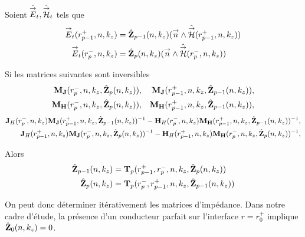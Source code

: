     \begin{prop}%
      \label{prop:cylindre:synthese:impedance}{}~

      Soient \(\hat{{\overset{\rightarrow}{E}}}_t,\hat{{\overset{\rightarrow}{\mathcal{H}}}}_t\) tels que 
      \begin{align*}
      {\overset{\rightarrow}{E}}_t(r_{p-1}^+,n,k_z) &= \hat{\mathbf{Z}}_{p-1}(n,k_z)({\overset{\rightarrow}{n}} \wedge \hat{{\overset{\rightarrow}{\mathcal{H}}}}(r_{p-1}^+,n,k_z))
      \\
      {\overset{\rightarrow}{E}}_t(r_{p}^-,n,k_z) &= \hat{\mathbf{Z}}_{p}(n,k_z)({\overset{\rightarrow}{n}} \wedge \hat{{\overset{\rightarrow}{\mathcal{H}}}}(r_{p}^-,n,k_z))
      \end{align*}

      Si les matrices suivantes sont inversibles
      \begin{align*}
        \mathbf{M}_{\mathbf{J}}(r_p^-,n,k_z,\hat{\mathbf{Z}}_{p}(n,k_z)), && \mathbf{M}_{\mathbf{J}}(r_{p-1}^+,n,k_z,\hat{\mathbf{Z}}_{p-1}(n,k_z)),
        \\
        \mathbf{M}_{\mathbf{H}}(r_p^-,n,k_z,\hat{\mathbf{Z}}_{p}(n,k_z)), && \mathbf{M}_{\mathbf{H}}(r_{p-1}^+,n,k_z,\hat{\mathbf{Z}}_{p-1}(n,k_z)),
      \end{align*}
      \begin{align*}
        \mathbf{J}_{H}(r_{p}^-,n,k_z)\mathbf{M}_{\mathbf{J}}(r_{p-1}^+,n,k_z,\hat{\mathbf{Z}}_{p-1}(n,k_z))^{-1} - \mathbf{H}_{H}(r_{p}^-,n,k_z)\mathbf{M}_{\mathbf{H}}(r_{p-1}^+,n,k_z,\hat{\mathbf{Z}}_{p-1}(n,k_z))^{-1},
        \\
        \mathbf{J}_{H}(r_{p-1}^+,n,k_z)\mathbf{M}_{\mathbf{J}}(r_{p}^-,n,k_z,\hat{\mathbf{Z}}_{p}(n,k_z))^{-1} - \mathbf{H}_{H}(r_{p-1}^+,n,k_z)\mathbf{M}_{\mathbf{H}}(r_{p}^-,n,k_z,\hat{\mathbf{Z}}_{p}(n,k_z))^{-1},
      \end{align*}

      Alors 
      \begin{align*}
        \hat{\mathbf{Z}}_{p-1}(n,k_z) &= \mathbf{T}_p(r_{p-1}^+,r_{p}^-,n,k_z,\hat{\mathbf{Z}}_{p}(n,k_z))
        \\
        \hat{\mathbf{Z}}_{p}(n,k_z) &= \mathbf{T}_p(r_{p}^-,r_{p-1}^+,n,k_z,\hat{\mathbf{Z}}_{p-1}(n,k_z))
      \end{align*}

    \end{prop}

    On peut donc déterminer itérativement les matrices d'impédance. Dans notre cadre d'étude, la présence d'un conducteur parfait sur l'interface \(r=r_0^+\) implique \(\hat{\mathbf{Z}}_{0}(n,k_z) = 0\).


